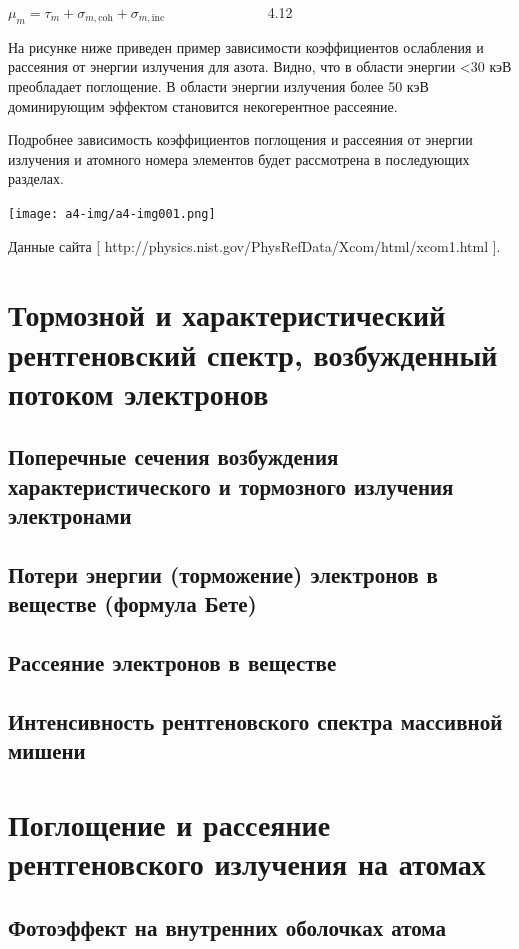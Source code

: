 \documentclass[a4paper,14pt, openany, twoside, draft]{extbook} %
\begin{document}
 $\mu _m=\tau _m+\sigma _{m,\text{coh}}+\sigma _{m,\text{inc}}$ \ \ \ \ \ \ \ \ \ \ \ \ \ \ 4.12

На рисунке ниже приведен пример зависимости коэффициентов ослабления и рассеяния от энергии излучения для азота. Видно, что в области энергии {\textless}30 кэВ преобладает поглощение. В области энергии излучения более 50 кэВ доминирующим эффектом становится некогерентное рассеяние.

Подробнее зависимость коэффициентов поглощения и рассеяния от энергии излучения и атомного номера элементов будет рассмотрена в последующих разделах.

 \texttt{[image: a4-img/a4-img001.png]}

Данные сайта [ http://physics.nist.gov/PhysRefData/Xcom/html/xcom1.html ].
\chapter{Тормозной и характеристический рентгеновский спектр, возбужденный потоком электронов}
\label{cha:torm-spec}

\section{Поперечные сечения возбуждения характеристического и тормозного излучения электронами}
\label{sec:sections}

\section{Потери энергии (торможение) электронов в веществе (формула Бете)}
\section{Рассеяние электронов в веществе}
\section{Интенсивность рентгеновского спектра массивной мишени}

\chapter{Поглощение и рассеяние рентгеновского излучения на атомах}
\label{cha:absorbtion}

\section{Фотоэффект на внутренних оболочках атома}
\end{document}
